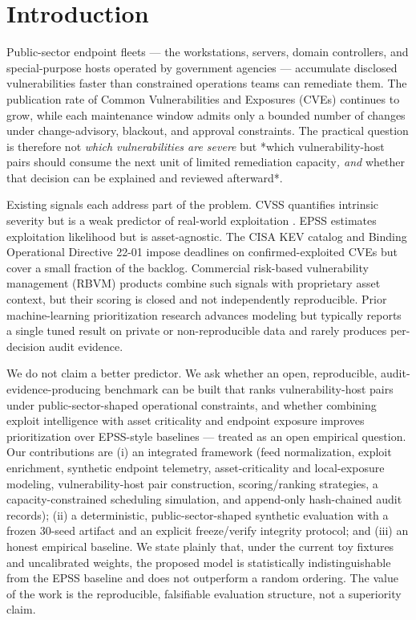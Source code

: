 \section{Introduction}

Public-sector endpoint fleets --- the workstations, servers, domain controllers, and
special-purpose hosts operated by government agencies --- accumulate disclosed
vulnerabilities faster than constrained operations teams can remediate them. The
publication rate of Common Vulnerabilities and Exposures (CVEs) continues to grow,
while each maintenance window admits only a bounded number of changes under
change-advisory, blackout, and approval constraints. The practical question is
therefore not \textit{which vulnerabilities are severe} but *which vulnerability-host
pairs should consume the next unit of limited remediation capacity\textit{, and }whether
that decision can be explained and reviewed afterward*.

Existing signals each address part of the problem. CVSS \cite{first_cvss_v31}
quantifies intrinsic severity but is a weak predictor of real-world exploitation
\cite{allodi2014comparing}. EPSS \cite{jacobs2021epss} estimates exploitation likelihood
but is asset-agnostic. The CISA KEV catalog \cite{cisa_kev} and Binding Operational
Directive 22-01 \cite{cisa_bod2201} impose deadlines on confirmed-exploited CVEs but
cover a small fraction of the backlog. Commercial risk-based vulnerability
management (RBVM) products combine such signals with proprietary asset context, but
their scoring is closed and not independently reproducible. Prior machine-learning
prioritization research advances modeling but typically reports a single tuned
result on private or non-reproducible data and rarely produces per-decision audit
evidence.

We do not claim a better predictor. We ask whether an open, reproducible,
audit-evidence-producing benchmark can be built that ranks vulnerability-host pairs
under public-sector-shaped operational constraints, and whether combining exploit
intelligence with asset criticality and endpoint exposure improves prioritization
over EPSS-style baselines --- treated as an open empirical question. Our
contributions are (i) an integrated framework (feed normalization, exploit
enrichment, synthetic endpoint telemetry, asset-criticality and local-exposure
modeling, vulnerability-host pair construction, scoring/ranking strategies, a
capacity-constrained scheduling simulation, and append-only hash-chained audit
records); (ii) a deterministic, public-sector-shaped synthetic evaluation with a
frozen 30-seed artifact and an explicit freeze/verify integrity protocol; and (iii)
an honest empirical baseline. We state plainly that, under the current toy fixtures
and uncalibrated weights, the proposed model is statistically indistinguishable
from the EPSS baseline and does not outperform a random ordering. The value of the
work is the reproducible, falsifiable evaluation structure, not a superiority claim.
